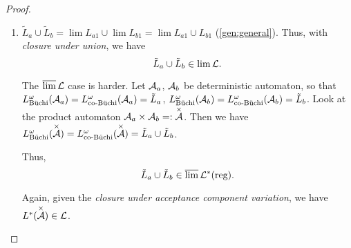 \begin{lemma}
\begin{proof}
\begin{enumerate}
\item
$\tilde L_a \cup \tilde L_b = \lim L_{a1} \cup \lim L_{b1} = \lim L_{a1} \cup L_{b1}$ (\ref{gen:general}). Thus, with \emph{closure under union}, we have
\[ \tilde L_a \cup \tilde L_b \in \lim \mathcal{L} . \]

The $\operatorname{\overline{lim}}\mathcal{L}$ case is harder.
Let $\mathcal{A}_a$, $\mathcal{A}_b$ be deterministic automaton, so that $L^\omega_{\text{Büchi}}(\mathcal{A}_a) = L^\omega_{\text{co-Büchi}}(\mathcal{A}_a) = \tilde L_a$, $L^\omega_{\text{Büchi}}(\mathcal{A}_b) = L^\omega_{\text{co-Büchi}}(\mathcal{A}_b) = \tilde L_b$. Look at the product automaton $\mathcal{A}_a \times \mathcal{A}_b =: \overset{\times}{\mathcal{A}}$. Then we have $L^\omega_{\text{Büchi}}(\overset{\times}{\mathcal{A}}) = L^\omega_{\text{co-Büchi}}(\overset{\times}{\mathcal{A}}) = \tilde L_a \cup \tilde L_b$.

Thus,
\[ \tilde L_a \cup \tilde L_b \in \operatorname{\overline{lim}} \mathcal{L}^*(\text{reg}) . \]

Again, given the \emph{closure under acceptance component variation}, we have $L^*(\overset{\times}{\mathcal{A}}) \in \mathcal{L}$.

\end{enumerate}
\end{proof}
\end{lemma}


